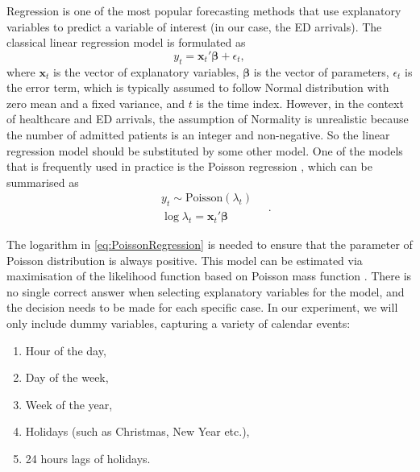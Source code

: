\documentclass[]{elsarticle} %
\providecommand{\tightlist}{%
  \setlength{\itemsep}{0pt}\setlength{\parskip}{0pt}}
\begin{document}
Regression is one of the most popular forecasting methods that use
explanatory variables to predict a variable of interest (in our case,
the ED arrivals). The classical linear regression model is formulated as
\begin{equation}
  {y}_t = \mathbf{x}_t' \boldsymbol{\beta} + \epsilon_t ,
\label{eq:linearRegression}
\end{equation} where \(\mathbf{x}_t\) is the vector of explanatory
variables, \(\boldsymbol{\beta}\) is the vector of parameters,
\(\epsilon_t\) is the error term, which is typically assumed to follow
Normal distribution with zero mean and a fixed variance, and \(t\) is the
time index. However, in the context of healthcare and ED arrivals, the
assumption of Normality is unrealistic because the number of admitted
patients is an integer and non-negative. So the linear regression model
should be substituted by some other model. One of the models that is
frequently used in practice is the Poisson regression \citep[see, for example,][]{mccarthy2008challenge}, which can be summarised as \begin{equation}
  \begin{aligned}
    & {y}_t \sim \mathrm{Poisson} \left( \lambda_t \right) \\
    & \log \lambda_t = \mathbf{x}_t' \boldsymbol{\beta}
  \end{aligned} \quad .
\label{eq:PoissonRegression}
\end{equation}

The logarithm in \eqref{eq:PoissonRegression} is needed to ensure that
the parameter of Poisson distribution is always positive. This model can
be estimated via maximisation of the likelihood function based on
Poisson mass function . There is no single
correct answer when selecting explanatory variables for the model, and
the decision needs to be made for each specific case. In our experiment,
we will only include dummy variables, capturing a variety of calendar
events:

\begin{enumerate}
\def\labelenumi{\arabic{enumi}.}
\tightlist
\item
  Hour of the day,
\item
  Day of the week,
\item
  Week of the year,
\item
  Holidays (such as Christmas, New Year etc.),
\item
  24 hours lags of holidays.
\end{enumerate}
\end{document}
